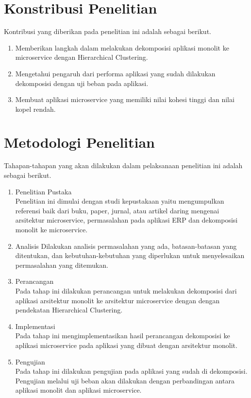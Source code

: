 \section{Konstribusi Penelitian}
Kontribusi yang diberikan pada penelitian ini adalah sebagai berikut.
\begin{enumerate}[nolistsep,leftmargin=0.5cm]
  \item Memberikan langkah dalam melakukan dekomposisi aplikasi monolit ke microservice dengan Hierarchical Clustering.
  \item Mengetahui pengaruh dari performa aplikasi yang sudah dilakukan dekomposisi dengan uji beban pada aplikasi.
  \item Membuat aplikasi microservice yang memiliki nilai kohesi tinggi dan nilai kopel rendah.\\
\end{enumerate}

\section{Metodologi Penelitian}
Tahapan-tahapan yang akan dilakukan dalam pelaksanaan penelitian ini adalah sebagai berikut.
\begin{enumerate}[nolistsep,leftmargin=0.5cm]
  \item Penelitian Pustaka \\
  Penelitian ini dimulai dengan studi kepustakaan yaitu mengumpulkan referensi baik dari buku, paper, jurnal, atau artikel daring mengenai arsitektur microservice, permasalahan pada aplikasi ERP dan dekomposisi monolit ke microservice.
  \item Analisis
  Dilakukan analisis permasalahan yang ada, batasan-batasan yang ditentukan, dan  kebutuhan-kebutuhan yang diperlukan untuk menyelesaikan permasalahan yang ditemukan.
  \item Perancangan \\
  Pada tahap ini dilakukan perancangan untuk melakukan dekomposisi dari aplikasi arsitektur monolit ke arsitektur microservice dengan dengan pendekatan Hierarchical Clustering.
  \item Implementasi \\
  Pada tahap ini mengimplementasikan hasil perancangan dekomposisi ke aplikasi microservice pada aplikasi yang dibuat dengan arsitektur monolit.
  \item Pengujian \\
  Pada tahap ini  dilakukan pengujian pada aplikasi yang sudah di dekomposisi. Pengujian melalui uji beban akan dilakukan dengan perbandingan antara aplikasi monolit dan aplikasi microservice.\\ 
\end{enumerate}

